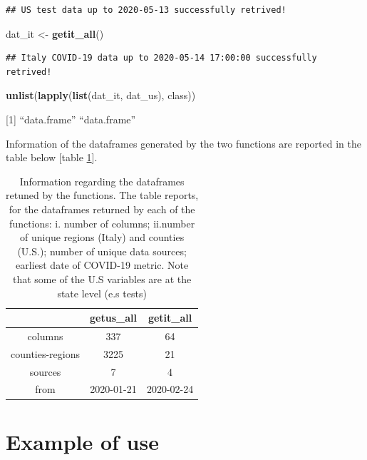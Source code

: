 \documentclass[12pt,halfline,a4paper,]{ouparticle}
\newenvironment{Shaded}{\begin{snugshade}}{\end{snugshade}}
\newcommand{\KeywordTok}[1]{\textcolor[rgb]{0.13,0.29,0.53}{\textbf{#1}}}
\newcommand{\NormalTok}[1]{#1}
\newcommand{\StringTok}[1]{\textcolor[rgb]{0.31,0.60,0.02}{#1}}
\begin{document}
\begin{verbatim}
## US test data up to 2020-05-13 successfully retrived!
\end{verbatim}

\begin{Shaded}
\begin{Highlighting}[]
\NormalTok{dat_it <-}\StringTok{ }\KeywordTok{getit_all}\NormalTok{()}
\end{Highlighting}
\end{Shaded}

\begin{verbatim}
## Italy COVID-19 data up to 2020-05-14 17:00:00 successfully retrived!
\end{verbatim}

\begin{Shaded}
\begin{Highlighting}[]
\KeywordTok{unlist}\NormalTok{(}\KeywordTok{lapply}\NormalTok{(}\KeywordTok{list}\NormalTok{(dat_it, dat_us), class))}
\end{Highlighting}
\end{Shaded}

{[}1{]} ``data.frame'' ``data.frame''

\bigskip

Information of the dataframes generated by the two functions are
reported in the table below {[}table \ref{tab:tab_dat}{]}.

\bigskip

\begin{table}[ht]
\centering
\begin{tabular}{ccc}
  \hline
 & getus\_all & getit\_all \\ 
  \hline
columns & 337 & 64 \\ 
  counties-regions & 3225 & 21 \\ 
  sources & 7 & 4 \\ 
  from & 2020-01-21 & 2020-02-24 \\ 
   \hline
\end{tabular}
\caption{Information regarding the dataframes retuned by the functions.
    The table reports, for the dataframes returned by each of the functions: i. number of columns; ii.number of unique regions (Italy) and counties (U.S.);  number of unique data sources; earliest date of COVID-19 metric. Note that some of 
    the U.S variables are at the state level (e.s tests)
    } 
\label{tab:tab_dat}
\end{table}

\hypertarget{example-of-use}{%
\section{Example of use}\label{example-of-use}}
\end{document}
